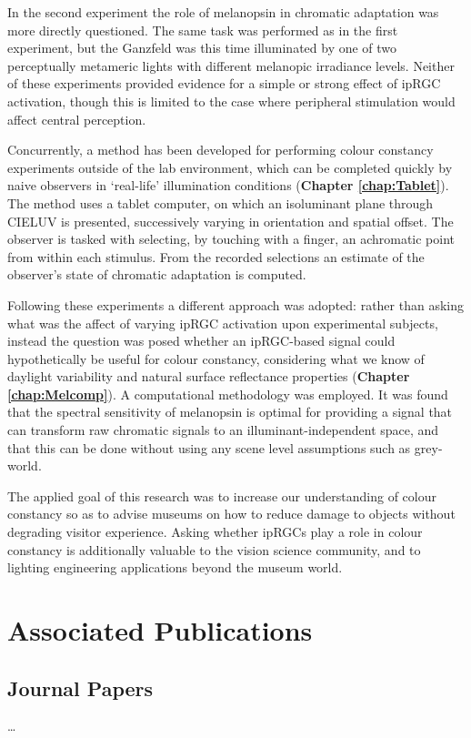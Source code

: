 In the second experiment the role of melanopsin in chromatic adaptation was more directly questioned. The same task was performed as in the first experiment, but the Ganzfeld was this time illuminated by one of two perceptually metameric lights with different melanopic irradiance levels. Neither of these experiments provided evidence for a simple or strong effect of ipRGC activation, though this is limited to the case where peripheral stimulation would affect central perception.

Concurrently, a method has been developed for performing colour constancy experiments outside of the lab environment, which can be completed quickly by naive observers in `real-life' illumination conditions (\textbf{Chapter \ref{chap:Tablet}}). The method uses a tablet computer, on which an isoluminant plane through CIELUV is presented, successively varying in orientation and spatial offset. The observer is tasked with selecting, by touching with a finger, an achromatic point from within each stimulus. From the recorded selections an estimate of the observer's state of chromatic adaptation is computed.

Following these experiments a different approach was adopted: rather than asking what was the affect of varying \gls{ipRGC} activation upon experimental subjects, instead the question was posed whether an \gls{ipRGC}-based signal could hypothetically be useful for colour constancy, considering what we know of daylight variability and natural surface reflectance properties (\textbf{Chapter \ref{chap:Melcomp}}). A computational methodology was employed. It was found that the spectral sensitivity of melanopsin is optimal for providing a signal that can transform raw chromatic signals to an illuminant-independent space, and that this can be done without using any scene level assumptions such as grey-world.

The applied goal of this research was to increase our understanding of colour constancy so as to advise museums on how to reduce damage to objects without degrading visitor experience. Asking whether \glspl{ipRGC} play a role in colour constancy is additionally valuable to the vision science community, and to lighting engineering applications beyond the museum world.

\section{Associated Publications}

\subsection*{Journal Papers}
\dots

